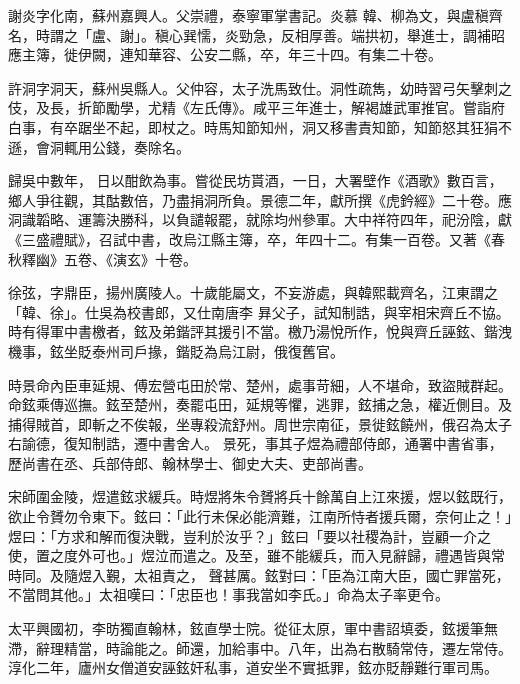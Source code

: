 \begin{pinyinscope}
 謝炎字化南，蘇州嘉興人。父崇禮，泰寧軍掌書記。炎慕
 韓、柳為文，與盧稹齊名，時謂之「盧、謝」。稹心巽懦，炎勁急，反相厚善。端拱初，舉進士，調補昭應主簿，徙伊闕，連知華容、公安二縣，卒，年三十四。有集二十卷。



 許洞字洞天，蘇州吳縣人。父仲容，太子洗馬致仕。洞性疏雋，幼時習弓矢擊刺之伎，及長，折節勵學，尤精《左氏傳》。咸平三年進士，解褐雄武軍推官。嘗詣府白事，有卒踞坐不起，即杖之。時馬知節知州，洞又移書責知節，知節怒其狂狷不遜，會洞輒用公錢，奏除名。



 歸吳中數年，
 日以酣飲為事。嘗從民坊貰酒，一日，大署壁作《酒歌》數百言，鄉人爭往觀，其酤數倍，乃盡捐洞所負。景德二年，獻所撰《虎鈐經》二十卷。應洞識韜略、運籌決勝科，以負譴報罷，就除均州參軍。大中祥符四年，祀汾陰，獻《三盛禮賦》，召試中書，改烏江縣主簿，卒，年四十二。有集一百卷。又著《春秋釋幽》五卷、《演玄》十卷。



 徐弦，字鼎臣，揚州廣陵人。十歲能屬文，不妄游處，與韓熙載齊名，江東謂之「韓、徐」。仕吳為校書郎，又仕南唐李
 昪父子，試知制誥，與宰相宋齊丘不協。時有得軍中書檄者，鉉及弟鍇評其援引不當。檄乃湯悅所作，悅與齊丘誣鉉、鍇洩機事，鉉坐貶泰州司戶掾，鍇貶為烏江尉，俄復舊官。



 時景命內臣車延規、傅宏營屯田於常、楚州，處事苛細，人不堪命，致盜賊群起。命鉉乘傳巡撫。鉉至楚州，奏罷屯田，延規等懼，逃罪，鉉捕之急，權近側目。及捕得賊首，即斬之不俟報，坐專殺流舒州。周世宗南征，景徙鉉饒州，俄召為太子右諭德，復知制誥，遷中書舍人。
 景死，事其子煜為禮部侍郎，通署中書省事，歷尚書在丞、兵部侍郎、翰林學士、御史大夫、吏部尚書。



 宋師圍金陵，煜遣鉉求緩兵。時煜將朱令贇將兵十餘萬自上江來援，煜以鉉既行，欲止令贇勿令東下。鉉曰：「此行未保必能濟難，江南所恃者援兵爾，奈何止之！」煜曰：「方求和解而復決戰，豈利於汝乎？」鉉曰「要以社稷為計，豈顧一介之使，置之度外可也。」煜泣而遣之。及至，雖不能緩兵，而入見辭歸，禮遇皆與常時同。及隨煜入覲，太祖責之，
 聲甚厲。鉉對曰：「臣為江南大臣，國亡罪當死，不當問其他。」太祖嘆曰：「忠臣也！事我當如李氏。」命為太子率更令。



 太平興國初，李昉獨直翰林，鉉直學士院。從征太原，軍中書詔填委，鉉援筆無滯，辭理精當，時論能之。師還，加給事中。八年，出為右散騎常侍，遷左常侍。淳化二年，廬州女僧道安誣鉉奸私事，道安坐不實抵罪，鉉亦貶靜難行軍司馬。




\end{pinyinscope}
